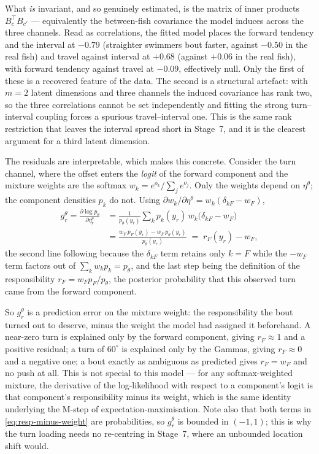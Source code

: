 What \emph{is} invariant, and so genuinely estimated, is the matrix of inner
products $B_c^{\top}B_{c'}$ --- equivalently the between-fish covariance the
model induces across the three channels. Read as correlations, the fitted model
places the forward tendency and the interval at $-0.79$ (straighter swimmers
bout faster, against $-0.50$ in the real fish) and travel against interval at
$+0.68$ (against $+0.06$ in the real fish), with forward tendency against travel
at $-0.09$, effectively null. Only the first of these is a recovered feature of
the data. The second is a structural artefact: with $m=2$ latent dimensions and
three channels the induced covariance has rank two, so the three correlations
cannot be set independently and fitting the strong turn--interval coupling
forces a spurious travel--interval one. This is the same rank restriction that
leaves the interval spread short in Stage~7, and it is the clearest argument for
a third latent dimension.

The residuals are interpretable, which makes this concrete. Consider the turn
channel, where the offset enters the \emph{logit} of the forward component and
the mixture weights are the softmax $w_k=e^{o_k}/\sum_j e^{o_j}$. Only the
weights depend on $\eta^{\theta}$; the component densities $p_k$ do not. Using
$\partial w_k/\partial\eta^{\theta}=w_k(\delta_{kF}-w_F)$,
\begin{align}
g^{\theta}_{r}
=\frac{\partial\log p_\theta}{\partial\eta^{\theta}_{r}}
&=\frac{1}{p_\theta(y_r)}\sum_k p_k(y_r)\,w_k\bigl(\delta_{kF}-w_F\bigr)
\nonumber\\
&=\frac{w_F\,p_F(y_r)-w_F\,p_\theta(y_r)}{p_\theta(y_r)}
\;=\;r_F(y_r)-w_F ,
\label{eq:resp-minus-weight}
\end{align}
the second line following because the $\delta_{kF}$ term retains only $k=F$
while the $-w_F$ term factors out of $\sum_k w_k p_k = p_\theta$, and the last
step being the definition of the responsibility
$r_F=w_F p_F/p_\theta$, the posterior probability that this observed turn came
from the forward component.

So $g^{\theta}_{r}$ is a prediction error on the mixture weight: the
responsibility the bout turned out to deserve, minus the weight the model had
assigned it beforehand. A near-zero turn is explained only by the forward
component, giving $r_F\approx1$ and a positive residual; a turn of $60^{\circ}$
is explained only by the Gammas, giving $r_F\approx0$ and a negative one; a bout
exactly as ambiguous as predicted gives $r_F=w_F$ and no push at all. This is
not special to this model --- for any softmax-weighted mixture, the derivative of
the log-likelihood with respect to a component's logit is that component's
responsibility minus its weight, which is the same identity underlying the
M-step of expectation-maximisation. Note also that both terms in
\eqref{eq:resp-minus-weight} are probabilities, so $g^{\theta}_{r}$ is bounded
in $(-1,1)$; this is why the turn loading needs no re-centring in Stage~7, where
an unbounded location shift would.

